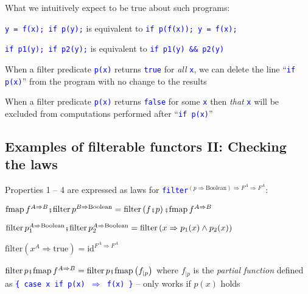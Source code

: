 What we intuitively expect to be true about such programs:

\texttt{\textcolor{blue}{\footnotesize{}y = f(x); if p(y);}} is equivalent
to \texttt{\textcolor{blue}{\footnotesize{}if p(f(x)); y = f(x);}} 

\texttt{\textcolor{blue}{\footnotesize{}if p1(y); if p2(y);}} is equivalent
to \texttt{\textcolor{blue}{\footnotesize{}if p1(y) \&\& p2(y)}} 

When a filter predicate \texttt{\textcolor{blue}{\footnotesize{}p(x)}}
returns \texttt{\textcolor{blue}{\footnotesize{}true}} for \emph{all}
\texttt{\textcolor{blue}{\footnotesize{}x}}, we can delete the line
``\texttt{\textcolor{blue}{\footnotesize{}if p(x)}}'' from the program
with no change to the results

When a filter predicate \texttt{\textcolor{blue}{\footnotesize{}p(x)}}
returns \texttt{\textcolor{blue}{\footnotesize{}false}} for some \texttt{\textcolor{blue}{\footnotesize{}x}}
then\emph{ that} \texttt{\textcolor{blue}{\footnotesize{}x}} will
be excluded from computations performed after ``\texttt{\textcolor{blue}{\footnotesize{}if
p(x)}}''


\subsection{Examples of filterable functors II: Checking the laws}

Properties 1 – 4 are expressed as laws for \texttt{\textcolor{blue}{\footnotesize{}filter}}$^{(p\Rightarrow\text{Boolean})\Rightarrow F^{A}\Rightarrow F^{A}}$:

{\footnotesize{}$\text{fmap}\,f^{A\Rightarrow B}\bef\text{filter}\,p^{B\Rightarrow\text{Boolean}}=\text{filter}\left(f\bef p\right)\bef\text{fmap}\,f^{A\Rightarrow B}$}{\footnotesize\par}

{\footnotesize{}$\text{filter}\,p_{1}^{A\Rightarrow\text{Boolean}}\bef\text{filter}\,p_{2}^{A\Rightarrow\text{Boolean}}=\text{filter}\left(x\Rightarrow p_{1}(x)\wedge p_{2}(x)\right)$}{\footnotesize\par}

{\footnotesize{}$\text{filter}\left(x^{A}\Rightarrow\text{true}\right)=\text{id}^{F^{A}\Rightarrow F^{A}}$ }{\footnotesize\par}

{\footnotesize{}$\text{filter}\,p\bef\text{fmap}\,f^{A\Rightarrow B}=\text{filter}\,p\bef\text{fmap}\left(f_{|p}\right)$
}where {\footnotesize{}$f_{|p}$} is the \emph{partial function} defined
as \texttt{\textcolor{blue}{\footnotesize{}\{ case x if p(x) $\Rightarrow$
f(x) \}}} – only works if $p(x)$ holds

